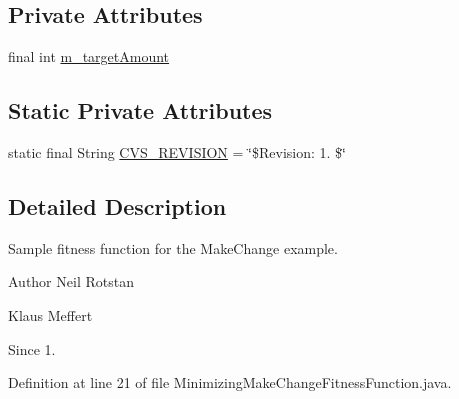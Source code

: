 \subsection*{Private Attributes}
\begin{DoxyCompactItemize}
\item 
final int \hyperlink{classexamples_1_1_minimizing_make_change_fitness_function_abc135156a658dd9e1d495b1621233b49}{m\-\_\-target\-Amount}
\end{DoxyCompactItemize}
\subsection*{Static Private Attributes}
\begin{DoxyCompactItemize}
\item 
static final String \hyperlink{classexamples_1_1_minimizing_make_change_fitness_function_afb9d4b41d5ad6212e7b98cc9d0aaaa73}{C\-V\-S\-\_\-\-R\-E\-V\-I\-S\-I\-O\-N} = \char`\"{}\$Revision\-: 1. \$\char`\"{}
\end{DoxyCompactItemize}


\subsection{Detailed Description}
Sample fitness function for the Make\-Change example.

\begin{DoxyAuthor}{Author}
Neil Rotstan 

Klaus Meffert 
\end{DoxyAuthor}
\begin{DoxySince}{Since}
1. 
\end{DoxySince}


Definition at line 21 of file Minimizing\-Make\-Change\-Fitness\-Function.\-java.



